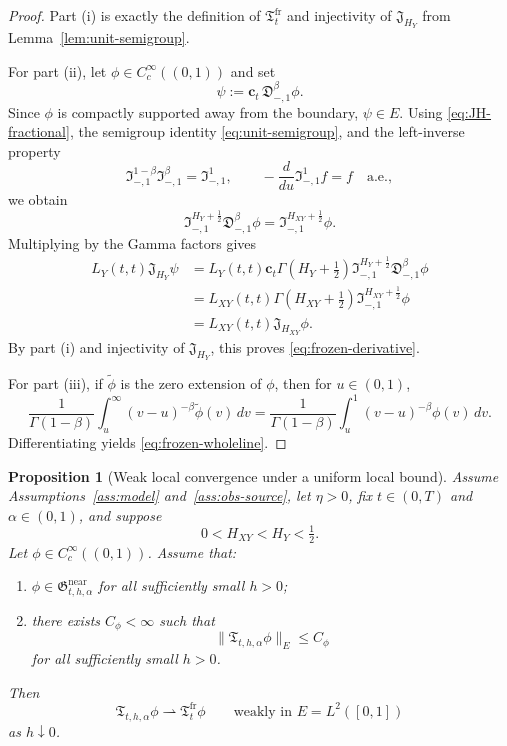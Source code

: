 \documentclass[11pt,a4paper]{amsart}
\theoremstyle{plain}
\newtheorem{proposition}[theorem]{Proposition}
\theoremstyle{definition}
\theoremstyle{remark}
\begin{document}
\begin{proof}
Part (i) is exactly the definition of $\mathfrak T_t^{\mathrm{fr}}$ and injectivity of
$\mathfrak J_{H_Y}$ from Lemma~\ref{lem:unit-semigroup}.

For part (ii), let $\phi\in C_c^\infty((0,1))$ and set
\[
\psi:=\mathbf c_t\,\mathfrak D_{-,1}^{\beta}\phi.
\]
Since $\phi$ is compactly supported away from the boundary, $\psi\in E$. Using
\eqref{eq:JH-fractional}, the semigroup identity \eqref{eq:unit-semigroup}, and the left-inverse
property
\[
\mathfrak I_{-,1}^{1-\beta}\mathfrak I_{-,1}^{\beta}= \mathfrak I_{-,1}^{1},
\qquad
-\frac{d}{du}\mathfrak I_{-,1}^{1}f=f
\quad\text{a.e.},
\]
we obtain
\[
\mathfrak I_{-,1}^{H_Y+\frac12}\mathfrak D_{-,1}^{\beta}\phi
=
\mathfrak I_{-,1}^{H_{XY}+\frac12}\phi.
\]
Multiplying by the Gamma factors gives
\begin{align*}
L_Y(t,t)\mathfrak J_{H_Y}\psi
&=
L_Y(t,t)\mathbf c_t\Gamma\!\left(H_Y+\frac12\right)
\mathfrak I_{-,1}^{H_Y+\frac12}\mathfrak D_{-,1}^{\beta}\phi \\
&=
L_{XY}(t,t)\Gamma\!\left(H_{XY}+\frac12\right)
\mathfrak I_{-,1}^{H_{XY}+\frac12}\phi \\
&=
L_{XY}(t,t)\mathfrak J_{H_{XY}}\phi.
\end{align*}
By part (i) and injectivity of $\mathfrak J_{H_Y}$, this proves \eqref{eq:frozen-derivative}.

For part (iii), if $\widetilde\phi$ is the zero extension of $\phi$, then for $u\in(0,1)$,
\[
\frac{1}{\Gamma(1-\beta)}\int_u^\infty (v-u)^{-\beta}\widetilde\phi(v)\,dv
=
\frac{1}{\Gamma(1-\beta)}\int_u^1 (v-u)^{-\beta}\phi(v)\,dv.
\]
Differentiating yields \eqref{eq:frozen-wholeline}.
\end{proof}

\begin{proposition}[Weak local convergence under a uniform local bound]
\label{prop:local-weak}
Assume Assumptions~\ref{ass:model} and~\ref{ass:obs-source}, let $\eta>0$, fix $t\in(0,T)$
and $\alpha\in(0,1)$, and suppose
\[
0<H_{XY}<H_Y<\tfrac12.
\]
Let $\phi\in C_c^\infty((0,1))$. Assume that:
\begin{enumerate}[label=(\roman*)]
\item \(\phi\in \mathfrak G_{t,h,\alpha}^{\mathrm{near}}\) for all sufficiently small \(h>0\);
\item there exists \(C_\phi<\infty\) such that
\begin{equation}\label{eq:local-L2-bound}
\|\mathfrak T_{t,h,\alpha}\phi\|_E\le C_\phi
\end{equation}
for all sufficiently small \(h>0\).
\end{enumerate}
Then
\begin{equation}\label{eq:local-weak}
\mathfrak T_{t,h,\alpha}\phi
\rightharpoonup
\mathfrak T_t^{\mathrm{fr}}\phi
\qquad\text{weakly in }E=L^2([0,1])
\end{equation}
as \(h\downarrow0\).
\end{proposition}
\end{document}
